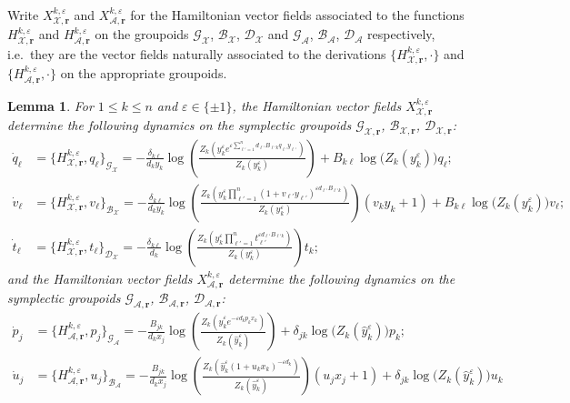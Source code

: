 \documentclass{amsart}
\newtheorem{lemma}[theorem]{Lemma}
\numberwithin{equation}{section}
\newcommand{\bfr}{{\boldsymbol{r}}}
\newcommand{\cA}{\mathcal{A}}
\newcommand{\cB}{\mathcal{B}}
\newcommand{\cD}{\mathcal{D}}
\newcommand{\cG}{\mathcal{G}}
\newcommand{\cX}{\mathcal{X}}
\begin{document}
Write $X_{\cX,\bfr}^{k,\varepsilon}$ and $X_{\cA,\bfr}^{k,\varepsilon}$ for the Hamiltonian vector fields associated to the functions $H_{\cX,\bfr}^{k,\varepsilon}$ and $H_{\cA,\bfr}^{k,\varepsilon}$ on the groupoids $\cG_\cX$, $\cB_\cX$, $\cD_\cX$ and $\cG_\cA$, $\cB_\cA$, $\cD_\cA$ respectively, i.e.\ they are the vector fields naturally associated to the derivations $\{H_{\cX,\bfr}^{k,\varepsilon},\cdot\}$ and $\{H_{\cA,\bfr}^{k,\varepsilon},\cdot\}$ on the appropriate groupoids.
\begin{lemma}
  For $1\le k\le n$ and $\varepsilon\in\{\pm1\}$, the Hamiltonian vector fields $X_{\cX,\bfr}^{k,\varepsilon}$ determine the following dynamics on the symplectic groupoids $\cG_{\cX,\bfr}$, $\cB_{\cX,\bfr}$, $\cD_{\cX,\bfr}$:
  \begin{align}
    \dot q_\ell&=\{H_{\cX,\bfr}^{k,\varepsilon},q_\ell\}_{\cG_\cX}=-\frac{\delta_{k\ell}}{d_ky_k}\log\left(\frac{Z_k\left(y_k^\varepsilon e^{\varepsilon\sum_{\ell'=1}^n d_{\ell'} B_{\ell' k}q_{\ell'} y_{\ell'}}\right)}{Z_k(y_k^\varepsilon)}\right)+B_{k\ell}\log\big(Z_k(y_k^\varepsilon)\big)q_\ell;\\
    \dot v_\ell&=\{H_{\cX,\bfr}^{k,\varepsilon},v_\ell\}_{\cB_\cX}=-\frac{\delta_{k\ell}}{d_ky_k}\log\left(\frac{Z_k\left(y_k^\varepsilon \prod_{\ell'=1}^n (1+v_{\ell'}y_{\ell'})^{\varepsilon d_{\ell'} B_{\ell' k}}\right)}{Z_k(y_k^\varepsilon)}\right)(v_ky_k+1)+B_{k\ell}\log\big(Z_k(y_k^\varepsilon)\big)v_\ell;\\
    \dot t_\ell&=\{H_{\cX,\bfr}^{k,\varepsilon},t_\ell\}_{\cD_\cX}=-\frac{\delta_{k\ell}}{d_k}\log\left(\frac{Z_k\left(y_k^\varepsilon \prod_{\ell'=1}^nt_{\ell'}^{\varepsilon d_{\ell'} B_{\ell' k}}\right)}{Z_k(y_k^\varepsilon)}\right)t_k;
  \end{align}
  and the Hamiltonian vector fields $X_{\cA,\bfr}^{k,\varepsilon}$ determine the following dynamics on the symplectic groupoids $\cG_{\cA,\bfr}$, $\cB_{\cA,\bfr}$, $\cD_{\cA,\bfr}$:
  \begin{align}
    \label{eq:p dot}
    \dot p_j&=\{H_{\cA,\bfr}^{k,\varepsilon},p_j\}_{\cG_\cA}=-\frac{B_{jk}}{d_kx_j}\log\left(\frac{Z_k\left(\hat y_k^\varepsilon e^{-\varepsilon d_kp_kx_k}\right)}{Z_k(\hat y_k^\varepsilon)}\right)+\delta_{jk}\log\big(Z_k(\hat y_k^\varepsilon)\big)p_k;\\
    \label{eq:u dot}
    \dot u_j&=\{H_{\cA,\bfr}^{k,\varepsilon},u_j\}_{\cB_\cA}=-\frac{B_{jk}}{d_kx_j}\log\left(\frac{Z_k\left(\hat y_k^\varepsilon (1+u_kx_k)^{-\varepsilon d_k}\right)}{Z_k(\hat y_k^\varepsilon)}\right)(u_jx_j+1)+\delta_{jk}\log\big(Z_k(\hat y_k^\varepsilon)\big)u_k\\

\end{align}
\end{lemma}
\end{document}
